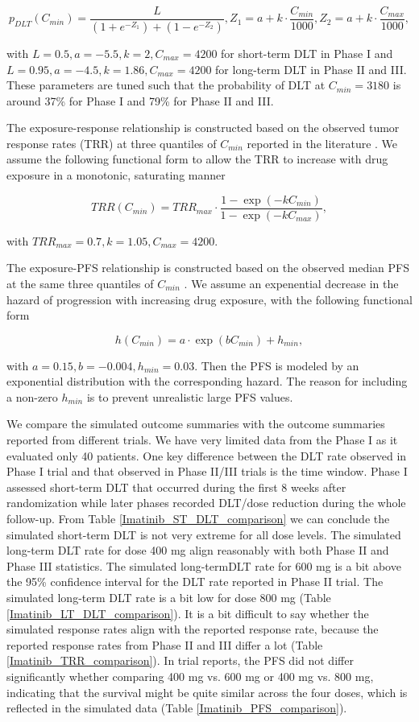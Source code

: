 \documentclass[11pt]{article}
\begin{document}
$$p_{DLT}(C_{min}) = \frac{L}{(1+e^{-Z_1})+(1-e^{-Z_2})}, Z_1 = a+k\cdot \frac{C_{min}}{1000}, Z_2 = a+k\cdot \frac{C_{max}}{1000},$$

with $L=0.5, a=-5.5, k=2, C_{max}=4200$ for short-term DLT in Phase I and $L=0.95, a=-4.5, k=1.86, C_{max}=4200$ for long-term DLT in Phase II and III. These parameters are tuned such that the probability of DLT at $C_{min}=3180$ is around 37\% for Phase I and 79\% for Phase II and III.

The exposure-response relationship is constructed based on the observed tumor response rates (TRR) at three quantiles of $C_{min}$ reported in the literature \parencite{demetri2009imatinib}. We assume the following functional form to allow the TRR to increase with drug exposure in a monotonic, saturating manner

$$TRR(C_{min}) = TRR_{max} \cdot \frac{1-\exp (-kC_{min})}{1-\exp (-kC_{max})},$$

with $TRR_{max}=0.7, k=1.05, C_{max}=4200$.

The exposure-PFS relationship is constructed based on the observed median PFS at the same three quantiles of $C_{min}$ \parencite{demetri2009imatinib}. We assume an expenential decrease in the hazard of progression with increasing drug exposure, with the following functional form

$$h(C_{min}) = a \cdot \exp (bC_{min})+h_{min},$$

with $a=0.15, b=-0.004, h_{min}=0.03$. Then the PFS is modeled by an exponential distribution with the corresponding hazard. The reason for including a non-zero $h_{min}$ is to prevent unrealistic large PFS values. 

We compare the simulated outcome summaries with the outcome summaries reported from different trials. We have very limited data from the Phase I as it evaluated only 40 patients. One key difference between the DLT rate observed in Phase I trial and that observed in Phase II/III trials is the time window. Phase I assessed short-term DLT that occurred during the first 8 weeks after randomization while later phases recorded DLT/dose reduction during the whole follow-up. From Table \ref{Imatinib_ST_DLT_comparison} we can conclude the simulated short-term DLT is not very extreme for all dose levels. The simulated long-term DLT rate for dose 400 mg align reasonably with both Phase II and Phase III statistics. The simulated long-termDLT rate for 600 mg is a bit above the 95\% confidence interval for the DLT rate reported in Phase II trial. The simulated long-term DLT rate is a bit low for dose 800 mg (Table \ref{Imatinib_LT_DLT_comparison}). It is a bit difficult to say whether the simulated response rates align with the reported response rate, because the reported response rates from Phase II and III differ a lot (Table \ref{Imatinib_TRR_comparison}). In trial reports, the PFS did not differ significantly whether comparing 400 mg vs. 600 mg or 400 mg vs. 800 mg, indicating that the survival might be quite similar across the four doses, which is reflected in the simulated data (Table \ref{Imatinib_PFS_comparison}).
\end{document}
